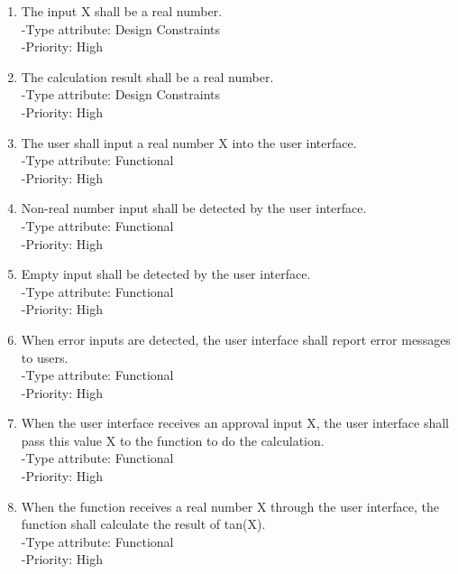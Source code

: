 \documentclass[12pt]{article}
\begin{document}
\begin{enumerate}
\item 	The input X shall be a real number.\\
 -Type attribute: Design Constraints\\
 -Priority: High\\

\item 	The calculation result shall be a real number.\\
 -Type attribute: Design Constraints\\
 -Priority: High\\

\item	The user shall input a real number X into the user interface.\\	
-Type attribute: Functional\\
-Priority: High\\


\item	Non-real number input shall be detected by the user interface.\\
-Type attribute: Functional\\
-Priority: High\\

\item	Empty input shall be detected by the user interface.\\
-Type attribute: Functional\\
-Priority: High\\

\item	When error inputs are detected, the user interface shall report error messages to users.\\
-Type attribute: Functional\\
-Priority: High\\

\item	When the user interface receives an approval input X, the user interface shall pass this value X to the function to do the calculation.\\
-Type attribute: Functional\\
-Priority: High\\

\item	When the function receives a real number X through the user interface, the function shall calculate the result of tan(X).\\
-Type attribute: Functional\\
-Priority: High\\


\end{enumerate}
\end{document}
